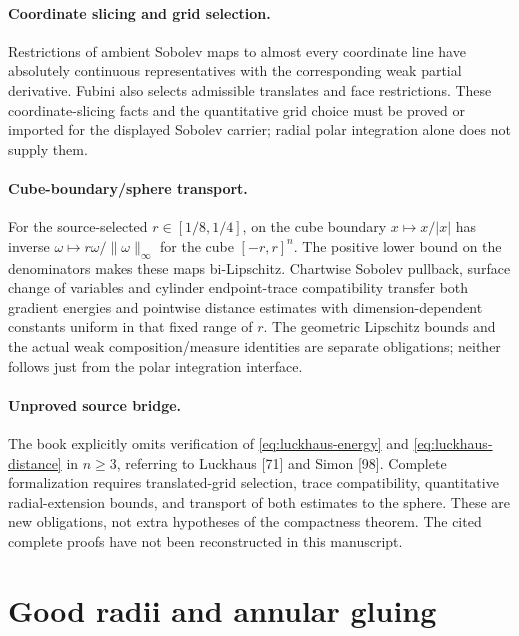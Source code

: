 \documentclass[11pt,a4paper]{article}
\numberwithin{equation}{section}
\theoremstyle{definition}
\theoremstyle{remark}
\begin{document}
\paragraph{Coordinate slicing and grid selection.}\label{lem:coordinate-acl}
Restrictions of ambient Sobolev maps to almost every coordinate line have
absolutely continuous representatives with the corresponding weak partial
derivative. Fubini also selects admissible translates and face restrictions.
These coordinate-slicing facts and the quantitative grid choice must be
proved or imported for the displayed Sobolev carrier; radial polar
integration alone does not supply them.

\paragraph{Cube-boundary/sphere transport.}\label{lem:cube-sphere}
For the source-selected $r\in[1/8,1/4]$, on the cube boundary
$x\mapsto x/|x|$ has inverse
$\omega\mapsto r\omega/\|\omega\|_\infty$ for the cube $[-r,r]^n$.
The positive lower bound on the denominators makes these maps
bi-Lipschitz. Chartwise Sobolev pullback, surface change of variables
and cylinder endpoint-trace compatibility transfer both gradient
energies and pointwise distance estimates with dimension-dependent
constants uniform in that fixed range of $r$. The geometric Lipschitz
bounds and the actual weak
composition/measure identities are separate obligations; neither follows
just from the polar integration interface.

\paragraph{Unproved source bridge.}\label{gap:luckhaus-estimates}
The book explicitly omits verification of \eqref{eq:luckhaus-energy} and
\eqref{eq:luckhaus-distance} in $n\ge3$, referring to Luckhaus [71] and
Simon [98]. Complete formalization requires translated-grid selection,
trace compatibility, quantitative radial-extension bounds, and transport
of both estimates to the sphere. These are new obligations, not extra
hypotheses of the compactness theorem. The cited complete proofs have not
been reconstructed in this manuscript.

\section{Good radii and annular gluing}
\end{document}
